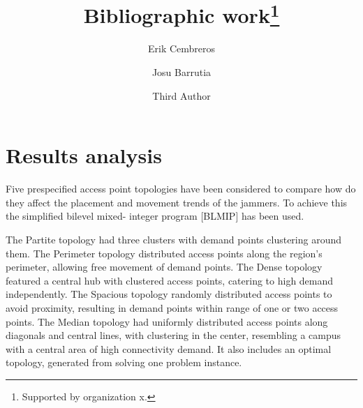\documentclass[runningheads]{llncs}
\begin{document}
	\title{Bibliographic work\thanks{Supported by organization x.}}
	\author{Erik Cembreros \and
		Josu Barrutia \and
		Third Author}
	\maketitle              %
	\begin{abstract}
			
		
	\end{abstract}
	
	\clearpage
	\section{Results analysis}
	
	Five prespecified access point topologies have been considered to compare how do they affect the placement and movement trends of the jammers. To achieve this the simplified bilevel mixed-
	integer program [BLMIP] has been used.
	
	The Partite topology had three clusters with demand points clustering around them. The Perimeter topology distributed access points along the region's perimeter, allowing free movement of demand points. The Dense topology featured a central hub with clustered access points, catering to high demand independently. The Spacious topology randomly distributed access points to avoid proximity, resulting in demand points within range of one or two access points. The Median topology had uniformly distributed access points along diagonals and central lines, with clustering in the center, resembling a campus with a central area of high connectivity demand. It also includes an optimal topology, generated from solving one problem instance.
	
\end{document}
